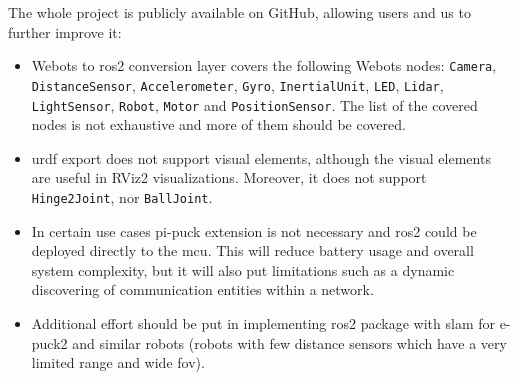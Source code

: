 The whole project is publicly available on GitHub, allowing users and us to further improve it:
\begin{itemize}
    \item Webots to \ac{ros2} conversion layer covers the following Webots nodes: \texttt{Camera}, \texttt{DistanceSensor}, \texttt{Accelerometer}, \texttt{Gyro}, \texttt{InertialUnit}, \texttt{LED}, \texttt{Lidar}, \texttt{LightSensor}, \texttt{Robot}, \texttt{Motor} and \texttt{PositionSensor}. The list of the covered nodes is not exhaustive and more of them should be covered.
    \item \ac{urdf} export does not support visual elements, although the visual elements are useful in RViz2 visualizations. Moreover, it does not support \texttt{Hinge2Joint}, nor \texttt{BallJoint}.
    \item In certain use cases pi-puck extension is not necessary and \ac{ros2} could be deployed directly to the \ac{mcu}.
    This will reduce battery usage and overall system complexity, but it will also put limitations such as a dynamic discovering of communication entities within a network.
    \item Additional effort should be put in implementing \ac{ros2} package with \ac{slam} for e-puck2 and similar robots (robots with few distance sensors which have a very limited range and wide \ac{fov}). 
\end{itemize}
